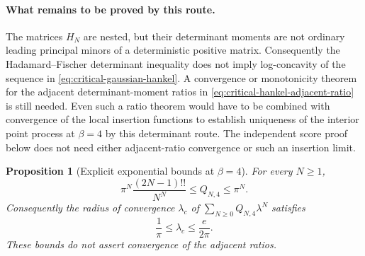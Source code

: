 \documentclass[11pt,a4paper]{article}
\numberwithin{equation}{section}
\newtheorem{proposition}[theorem]{Proposition}
\theoremstyle{definition}
\theoremstyle{remark}
\begin{document}
\paragraph{What remains to be proved by this route.}
The matrices $H_N$ are nested, but their determinant moments are not
ordinary leading principal minors of a deterministic positive matrix.
Consequently the Hadamard--Fischer determinant inequality does not imply
log-concavity of the sequence in \eqref{eq:critical-gaussian-hankel}.
A convergence or monotonicity theorem for the adjacent determinant-moment
ratios in \eqref{eq:critical-hankel-adjacent-ratio} is still needed.
Even such a ratio theorem would have to be combined with convergence of
the local insertion functions to establish uniqueness of the interior
point process at $\beta=4$ by this determinant route. The independent
score proof below does not need either adjacent-ratio convergence
or such an insertion limit.

\begin{proposition}[Explicit exponential bounds at $\beta=4$]
\label{prop:critical-partition-exponential-bounds}
For every $N\geq1$,
\begin{equation}
 \pi^N\frac{(2N-1)!!}{N^N}\leq Q_{N,4}\leq\pi^N.
 \label{eq:critical-partition-exponential-bounds}
\end{equation}
Consequently the radius of convergence $\lambda_c$ of
$\sum_{N\geq0}Q_{N,4}\lambda^N$ satisfies
\begin{equation}
 \frac1\pi\leq\lambda_c\leq\frac e{2\pi}.
 \label{eq:critical-grandcanonical-radius-bounds}
\end{equation}
These bounds do not assert convergence of the adjacent ratios.
\end{proposition}
\end{document}
